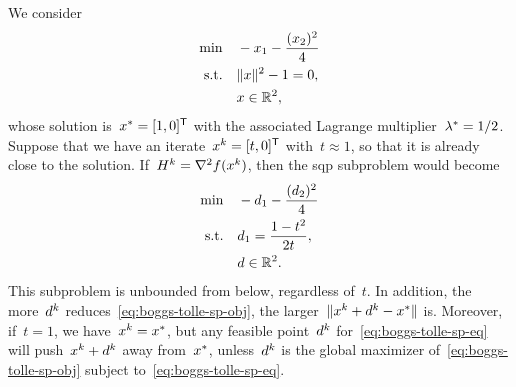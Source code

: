 We consider
\begin{align*}
    \min        & \quad -\iter_1 - \frac{(\iter_2)^2}{4}\\
    \text{s.t.} & \quad \norm{\iter}^2 - 1 = 0,\\
                & \quad \iter \in \R^2,
\end{align*}
whose solution is~$\iter[\ast] = [1, 0]^{\T}$ with the associated Lagrange multiplier~$\lm[\ast] = 1/2$.
Suppose that we have an iterate~$\iter[k] = [t, 0]^{\T}$ with~$t \approx 1$, so that it is already close to the solution.
If~$H^k = \nabla^2 \obj(\iter[k])$, then the \gls{sqp} subproblem would become
\begin{subequations}
    \begin{align}
        \min        & \quad -\step_1 - \frac{(\step_2)^2}{4} \label{eq:boggs-tolle-sp-obj}\\
        \text{s.t.} & \quad \step_1 = \frac{1 - t^2}{2 t}, \label{eq:boggs-tolle-sp-eq}\\
                    & \quad \step \in \R^2. \nonumber
    \end{align}
\end{subequations}
This subproblem is unbounded from below, regardless of~$t$.
In addition, the more~$\step[k]$ reduces~\cref{eq:boggs-tolle-sp-obj}, the larger~$\norm{\iter[k] + \step[k] - \iter[\ast]}$ is.
Moreover, if~$t = 1$, we have~$\iter[k] = \iter[\ast]$, but any feasible point~$\step[k]$ for~\cref{eq:boggs-tolle-sp-eq} will push~$\iter[k] + \step[k]$ away from~$\iter[\ast]$, unless~$\step[k]$ is the global maximizer of~\cref{eq:boggs-tolle-sp-obj} subject to~\cref{eq:boggs-tolle-sp-eq}.

